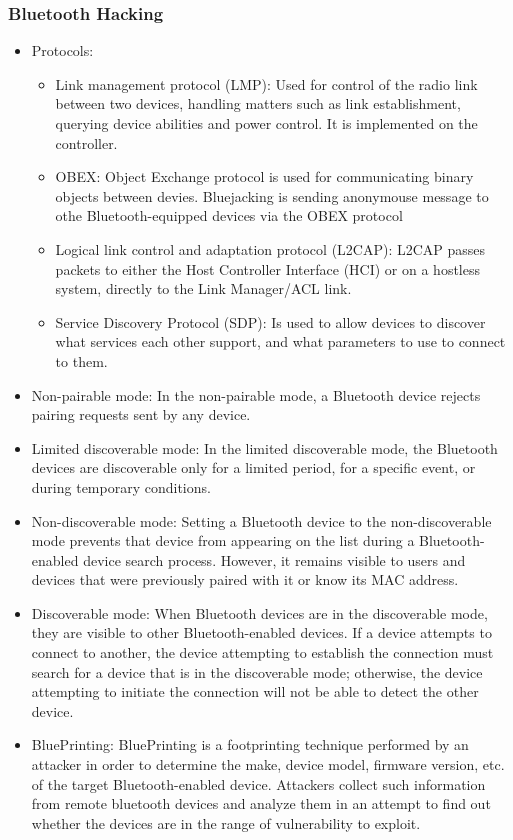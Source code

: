 \subsubsection{Bluetooth Hacking}
\begin{itemize}
    \item Protocols:
    \begin{itemize}
        \item Link management protocol (LMP): Used for control of the radio link between two devices, handling matters such as link establishment, querying device abilities and power control. It is implemented on the controller.
        \item OBEX: Object Exchange protocol is used for communicating binary objects between devies. Bluejacking is sending anonymouse message to othe Bluetooth-equipped devices via the OBEX protocol
        \item Logical link control and adaptation protocol (L2CAP): L2CAP passes packets to either the Host Controller Interface (HCI) or on a hostless system, directly to the Link Manager/ACL link.
        \item Service Discovery Protocol (SDP): Is used to allow devices to discover what services each other support, and what parameters to use to connect to them.
    \end{itemize}
    \item Non-pairable mode: In the non-pairable mode, a Bluetooth device rejects pairing requests sent by any device.
    \item Limited discoverable mode: In the limited discoverable mode, the Bluetooth devices are discoverable only for a limited period, for a specific event, or during temporary conditions.
    \item Non-discoverable mode: Setting a Bluetooth device to the non-discoverable mode prevents that device from appearing on the list during a Bluetooth-enabled device search process. However, it remains visible to users and devices that were previously paired with it or know its MAC address.
    \item Discoverable mode: When Bluetooth devices are in the discoverable mode, they are visible to other Bluetooth-enabled devices. If a device attempts to connect to another, the device attempting to establish the connection must search for a device that is in the discoverable mode; otherwise, the device attempting to initiate the connection will not be able to detect the other device.
    \item BluePrinting: BluePrinting is a footprinting technique performed by an attacker in order to determine the make, device model, firmware version, etc. of the target Bluetooth-enabled device. Attackers collect such information from remote bluetooth devices and analyze them in an attempt to find out whether the devices are in the range of vulnerability to exploit.

\end{itemize}
